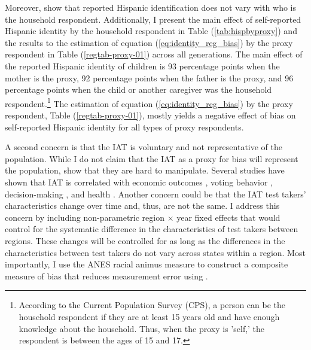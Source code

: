 \documentclass[12pt,english]{article}
\begin{document}
Moreover, \textcite{duncanIntermarriageIntergenerationalTransmission2011} show that reported Hispanic identification does not vary with who is the household respondent. Additionally, I present the main effect of self-reported Hispanic identity by the household respondent in Table (\ref{tab:hispbyproxy}) and the results to the estimation of equation (\ref{eq:identity_reg_bias}) by the proxy respondent in Table (\ref{regtab-proxy-01}) across all generations. The main effect of the reported Hispanic identity of children is 93 percentage points when the mother is the proxy, 92 percentage points when the father is the proxy, and 96 percentage points when the child or another caregiver was the household respondent.\footnote{According to the Current Population Survey (CPS), a person can be the household respondent if they are at least 15 years old and have enough knowledge about the household. Thus, when the proxy is 'self,' the respondent is between the ages of 15 and 17.} The estimation of equation (\ref{eq:identity_reg_bias}) by the proxy respondent, Table (\ref{regtab-proxy-01}), mostly yields a negative effect of bias on self-reported Hispanic identity for all types of proxy respondents.

A second concern is that the IAT is voluntary and not representative of the population. While I do not claim that the IAT  as a proxy for bias will represent the population, \textcite{egloffPredictiveValidityImplicit2002} show that they are hard to manipulate. Several studies have shown that IAT is correlated with economic outcomes \autocite{chettyRaceEconomicOpportunity2020,gloverDiscriminationSelfFulfillingProphecy2017}, voting behavior \autocite{friesePredictingVotingBehavior2007}, decision-making \autocite{bertrandImplicitDiscrimination2005,carlanaImplicitStereotypesEvidence2019}, and health \autocite{leitnerRacialBiasAssociated2016}. Another concern could be that the IAT test takers' characteristics change over time and, thus, are not the same. I address this concern by including non-parametric region $\times$ year fixed effects that would control for the systematic difference in the characteristics of test takers between regions. These changes will be controlled for as long as the differences in the characteristics between test takers do not vary across states within a region. Most importantly, I use the ANES racial animus measure to construct a composite measure of bias that reduces measurement error using \textcite{lubotskyInterpretationRegressionsMultiple2006}.
\end{document}
